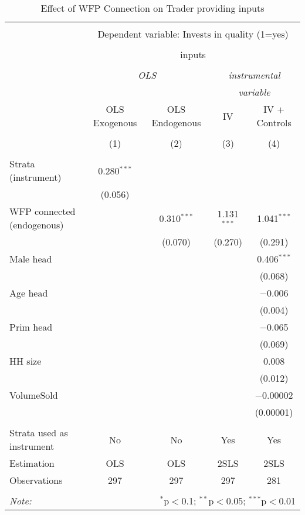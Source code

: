 
\begin{table}[!htbp] \centering 
  \caption{Effect of WFP Connection on Trader providing inputs} 
  \label{tab:wfp_trader_inputs} 
\begin{tabular}{@{\extracolsep{5pt}}lcccc} 
\\[-1.8ex]\hline 
\hline \\[-1.8ex] 
 & \multicolumn{4}{c}{Dependent variable: Invests in quality (1=yes)} \\ 
\cline{2-5} 
\\[-1.8ex] & \multicolumn{4}{c}{inputs} \\ 
\\[-1.8ex] & \multicolumn{2}{c}{\textit{OLS}} & \multicolumn{2}{c}{\textit{instrumental}} \\ 
 & \multicolumn{2}{c}{\textit{}} & \multicolumn{2}{c}{\textit{variable}} \\ 
 & OLS Exogenous & OLS Endogenous & IV & IV + Controls \\ 
\\[-1.8ex] & (1) & (2) & (3) & (4)\\ 
\hline \\[-1.8ex] 
 Strata (instrument) & 0.280$^{***}$ &  &  &  \\ 
  & (0.056) &  &  &  \\ 
  WFP connected (endogenous) &  & 0.310$^{***}$ & 1.131$^{***}$ & 1.041$^{***}$ \\ 
  &  & (0.070) & (0.270) & (0.291) \\ 
  Male head &  &  &  & 0.406$^{***}$ \\ 
  &  &  &  & (0.068) \\ 
  Age head &  &  &  & $-$0.006 \\ 
  &  &  &  & (0.004) \\ 
  Prim head &  &  &  & $-$0.065 \\ 
  &  &  &  & (0.069) \\ 
  HH size &  &  &  & 0.008 \\ 
  &  &  &  & (0.012) \\ 
  VolumeSold &  &  &  & $-$0.00002 \\ 
  &  &  &  & (0.00001) \\ 
 \hline \\[-1.8ex] 
Strata used as instrument & No & No & Yes & Yes \\ 
Estimation & OLS & OLS & 2SLS & 2SLS \\ 
Observations & 297 & 297 & 297 & 281 \\ 
\hline 
\hline \\[-1.8ex] 
\textit{Note:}  & \multicolumn{4}{r}{$^{*}$p$<$0.1; $^{**}$p$<$0.05; $^{***}$p$<$0.01} \\ 
\end{tabular} 
\end{table} 
